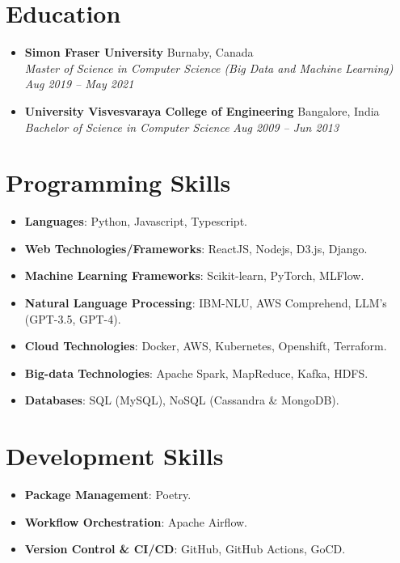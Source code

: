 \documentclass[11pt,a4paper]{article}
\newcommand{\educationitem}[4]{%
  \noindent\textbf{#1} \hfill #2 \\
  \textit{#3} \hfill \textit{#4}
}
\begin{document}
\section{Education}

\begin{itemize}[leftmargin=*, itemsep=4pt, topsep=2pt]
  \item
    \educationitem{Simon Fraser University}{Burnaby, Canada}{Master of Science in Computer Science (Big Data and Machine Learning)}{Aug 2019 -- May 2021}
  \item
    \educationitem{University Visvesvaraya College of Engineering}{Bangalore, India}{Bachelor of Science in Computer Science}{Aug 2009 -- Jun 2013}
\end{itemize}

\section{Programming Skills}

\begin{itemize}[leftmargin=*, itemsep=2pt, topsep=2pt]
  \item \textbf{Languages}: Python, Javascript, Typescript.
  \item \textbf{Web Technologies/Frameworks}: ReactJS, Nodejs, D3.js, Django.
  \item \textbf{Machine Learning Frameworks}: Scikit-learn, PyTorch, MLFlow.
  \item \textbf{Natural Language Processing}: IBM-NLU, AWS Comprehend, LLM's (GPT-3.5, GPT-4).
  \item \textbf{Cloud Technologies}: Docker, AWS, Kubernetes, Openshift, Terraform.
  \item \textbf{Big-data Technologies}: Apache Spark, MapReduce, Kafka, HDFS.
  \item \textbf{Databases}: SQL (MySQL), NoSQL (Cassandra \& MongoDB).
\end{itemize}

\section{Development Skills}

\begin{itemize}[leftmargin=*, itemsep=2pt, topsep=2pt]
  \item \textbf{Package Management}: Poetry.
  \item \textbf{Workflow Orchestration}: Apache Airflow.
  \item \textbf{Version Control \& CI/CD}: GitHub, GitHub Actions, GoCD.
\end{itemize}
\end{document}
